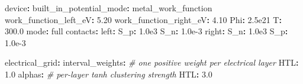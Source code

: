 \documentclass[
  11pt,
  american,
]{report}
\newenvironment{Shaded}{}{}
\newcommand{\AttributeTok}[1]{\textcolor[rgb]{0.49,0.56,0.16}{#1}}
\newcommand{\CommentTok}[1]{\textcolor[rgb]{0.38,0.63,0.69}{\textit{#1}}}
\newcommand{\FloatTok}[1]{\textcolor[rgb]{0.25,0.63,0.44}{#1}}
\newcommand{\FunctionTok}[1]{\textcolor[rgb]{0.02,0.16,0.49}{#1}}
\newcommand{\KeywordTok}[1]{\textcolor[rgb]{0.00,0.44,0.13}{\textbf{#1}}}
\begin{document}
\begin{Shaded}
\begin{Highlighting}[]
\FunctionTok{device}\KeywordTok{:}
\AttributeTok{  }\FunctionTok{built\_in\_potential\_mode}\KeywordTok{:}\AttributeTok{ metal\_work\_function}
\AttributeTok{  }\FunctionTok{work\_function\_left\_eV}\KeywordTok{:}\AttributeTok{ }\FloatTok{5.20}
\AttributeTok{  }\FunctionTok{work\_function\_right\_eV}\KeywordTok{:}\AttributeTok{ }\FloatTok{4.10}
\AttributeTok{  }\FunctionTok{Phi}\KeywordTok{:}\AttributeTok{ }\FloatTok{2.5e21}
\AttributeTok{  }\FunctionTok{T}\KeywordTok{:}\AttributeTok{ }\FloatTok{300.0}
\AttributeTok{  }\FunctionTok{mode}\KeywordTok{:}\AttributeTok{ full}
\AttributeTok{  }\FunctionTok{contacts}\KeywordTok{:}
\AttributeTok{    }\FunctionTok{left}\KeywordTok{:}
\AttributeTok{      }\FunctionTok{S\_p}\KeywordTok{:}\AttributeTok{ }\FloatTok{1.0e3}
\AttributeTok{      }\FunctionTok{S\_n}\KeywordTok{:}\AttributeTok{ }\FloatTok{1.0e{-}3}
\AttributeTok{    }\FunctionTok{right}\KeywordTok{:}
\AttributeTok{      }\FunctionTok{S\_n}\KeywordTok{:}\AttributeTok{ }\FloatTok{1.0e3}
\AttributeTok{      }\FunctionTok{S\_p}\KeywordTok{:}\AttributeTok{ }\FloatTok{1.0e{-}3}

\FunctionTok{electrical\_grid}\KeywordTok{:}
\AttributeTok{  }\FunctionTok{interval\_weights}\KeywordTok{:}\CommentTok{       \# one positive weight per electrical layer}
\AttributeTok{    }\FunctionTok{HTL}\KeywordTok{:}\AttributeTok{ }\FloatTok{1.0}
\AttributeTok{  }\FunctionTok{alphas}\KeywordTok{:}\CommentTok{                 \# per{-}layer tanh clustering strength}
\AttributeTok{    }\FunctionTok{HTL}\KeywordTok{:}\AttributeTok{ }\FloatTok{3.0}


\end{Highlighting}
\end{Shaded}
\end{document}
